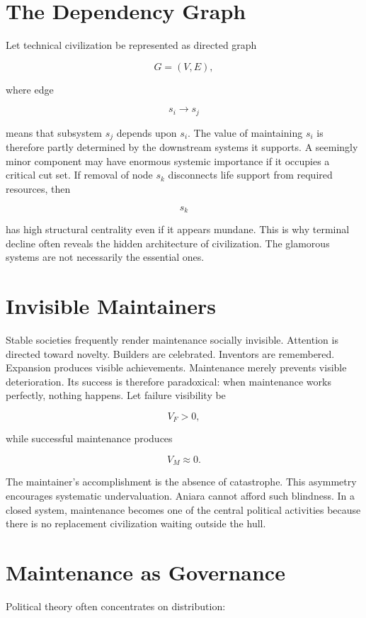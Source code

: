 \documentclass[11pt,oneside]{book}
\theoremstyle{definition}
\theoremstyle{remark}
\begin{document}
\section{The Dependency Graph}

Let technical civilization be represented as directed graph

\[
G=(V,E),
\]

where edge

\[
s_i\rightarrow s_j
\]

means that subsystem \(s_j\) depends upon \(s_i\). The value of maintaining \(s_i\) is therefore
partly determined by the downstream systems it supports. A seemingly minor component may have
enormous systemic importance if it occupies a critical cut set. If removal of node \(s_k\)
disconnects life support from required resources, then

\[
s_k
\]

has high structural centrality even if it appears mundane. This is why terminal decline often
reveals the hidden architecture of civilization. The glamorous systems are not necessarily the
essential ones.

\section{Invisible Maintainers}

Stable societies frequently render maintenance socially invisible. Attention is directed toward
novelty. Builders are celebrated. Inventors are remembered. Expansion produces visible achievements.
Maintenance merely prevents visible deterioration. Its success is therefore paradoxical: when
maintenance works perfectly, nothing happens. Let failure visibility be

\[
V_F>0,
\]

while successful maintenance produces

\[
V_M\approx0.
\]

The maintainer's accomplishment is the absence of catastrophe. This asymmetry encourages systematic
undervaluation. Aniara cannot afford such blindness. In a closed system, maintenance becomes one of
the central political activities because there is no replacement civilization waiting outside the
hull.

\section{Maintenance as Governance}

Political theory often concentrates on distribution:
\end{document}
